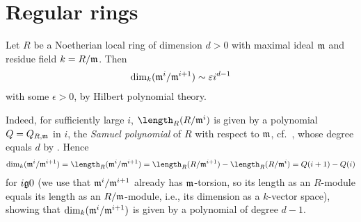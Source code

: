 \documentclass[a4paper,parskip=half,numbers=enddot, DIV=12]{scrreprt}
\begin{document}
\section{Regular rings}
Let $R$ be a Noetherian local ring of dimension $d>0$ with maximal ideal $\mathfrak{m}$ and residue field $k=R/\mathfrak{m}$. Then
\begin{align*}
	\dim_k(\mathfrak{m}^i/\mathfrak{m}^{i+1})\sim \varepsilon i^{d-1}
\end{align*}
with some $\epsilon>0$, by Hilbert polynomial theory.

Indeed, for sufficiently large $i$, $\length_R(R/\mm^i)$ is given by a polynomial $Q=Q_{R,\mathfrak{m}}$ in $i$, the \emph{Samuel polynomial} of $R$ with respect to $\mathfrak{m}$, cf.\ \cite[Definition~3.4.3]{alg2}, whose degree equals $d$ by \cite[Theorem~20]{alg2}. Hence
\begin{align*}
	\dim_k(\mm^i/\mm^{i+1})=\length_R(\mm^i/\mm^{i+1})=\length_R(R/\mm^{i+1})-\length_R(R/\mm^i)=Q(i+1)-Q(i)
\end{align*}
for $i\gge 0$ (we use that $\mathfrak{m}^i/\mathfrak{m}^{i+1}$ already has $\mathfrak{m}$-torsion, so its length as an $R$-module equals its length as an $R/\mathfrak{m}$-module, i.e., its dimension as a $k$-vector space), showing that $\dim_k(\mathfrak{m}^i/\mathfrak{m}^{i+1})$ is given by a polynomial of degree $d-1$.
\end{document}

